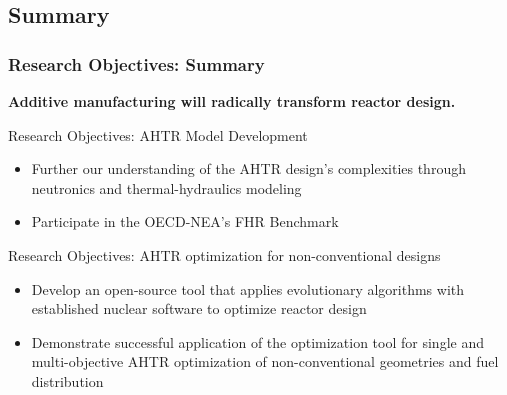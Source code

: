 \subsection{Summary}
\begin{frame}
    \frametitle{Research Objectives: Summary}
    \textbf{Additive manufacturing will radically transform reactor design.}
    \begin{block}{Research Objectives: AHTR Model Development}
        \begin{itemize}
            \item Further our understanding of the AHTR design's complexities 
            through neutronics and thermal-hydraulics modeling
            \item Participate in the OECD-NEA's FHR Benchmark
        \end{itemize}
    \end{block}

    \begin{block}{Research Objectives: AHTR optimization for non-conventional designs}
        \begin{itemize}
            \item Develop an open-source tool that applies evolutionary algorithms with established 
            nuclear software to optimize reactor design
            \item Demonstrate successful application of the optimization tool 
            for single and multi-objective AHTR optimization of 
            non-conventional geometries and fuel distribution
        \end{itemize}
    \end{block}
\end{frame}